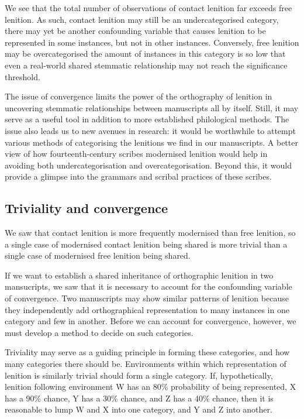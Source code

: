 We see that the total number of observations of contact lenition far exceeds free lenition. As such, contact lenition may still be an undercategorised category, \ie there may yet be another confounding variable that causes lenition to be represented in some instances, but not in other instances. Conversely, free lenition may be overcategorised \ie the amount of instances in this category is so low that even a real-world shared stemmatic relationship may not reach the significance threshold. 

The issue of convergence  limits the power of the orthography of lenition in uncovering stemmatic relationships between manuscripts all by itself. Still, it may serve as a useful tool in addition to more established philological methods. The issue also leads us to new avenues in research: it would be worthwhile to attempt various methods of categorising the lenitions we find in our manuscripts. A better view of how fourteenth-century scribes modernised lenition would help in avoiding both undercategorisation and overcategorisation. Beyond this, it would provide a glimpse into the grammars and scribal practices of these scribes.

\subsection{Triviality and convergence}
\label{sec:triv-conv}

We saw that contact lenition is more frequently modernised than free lenition, so a single case of modernised contact lenition being shared is more trivial than a single case of modernised free lenition being shared. 

If we want to establish a shared inheritance of orthographic lenition in two mansucripts, we saw that it is necessary to account for the confounding variable of convergence. Two manuscripts may show similar patterns of lenition because they independently add orthographical representation to many instances in one category and few in another. Before we can account for convergence, however, we must develop a method to decide on such categories.

Triviality may serve as a guiding principle in forming these categories, and how many categories there should be. Environments within which representation of lenition is similarly trivial should form a single category. If, hypothetically, lenition following environment W has an 80\% probability of being represented, X has a 90\% chance, Y has a 30\% chance, and Z has a 40\% chance, then it is reasonable to lump W and X into one category, and Y and Z into another.

